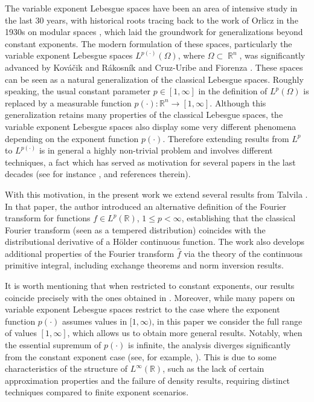 \documentclass[11pt,reqno]{amsart}
\theoremstyle{definition}
\theoremstyle{definition}
\theoremstyle{definition}
\DeclareMathOperator{\R}{\mathbb{R}}
\begin{document}


The variable exponent Lebesgue spaces have been an area of intensive study in the last 30 years, with historical roots tracing back to the work of Orlicz in the 1930s on modular spaces \cite{Orlicz1932}, which laid the groundwork for generalizations beyond constant exponents. The modern formulation of these spaces, particularly the variable exponent Lebesgue spaces $L^{p(\cdot)}(\Omega)$, where $\Omega\subset \R^n$, was significantly advanced by Kováčik and Rákosník \cite{KovacikRakosnik1991} and Cruz-Uribe and Fiorenza \cite{Cruz-Uribe}. These spaces can be seen as a natural generalization of the classical Lebesgue spaces. Roughly speaking, the usual constant parameter $p\in [1,\infty]$ in the definition of $L^p({\Omega})$ is replaced by a measurable function $p(\cdot):\mathbb{R}^n\to [1,\infty]$. Although this generalization retains many properties of the classical Lebesgue spaces, the variable exponent Lebesgue spaces also display some very different phenomena depending on the exponent function $p(\cdot)$. Therefore extending results from $L^p$ to $L^{p(\cdot)}$ is in general a highly non-trivial problem and involves different techniques, a fact which has served as motivation for several papers in the last decades (see for instance  \cite{Chamorro, CUHM16, Diening2004, Diening2004b, Sam98}, and references therein).

With this motivation, in the present work we extend several results from Talvila \cite{Talvila2025}. In that paper, the author introduced an alternative definition of the Fourier transform for functions $f \in L^p(\mathbb{R})$, $1\leq p<\infty$, establishing that the classical Fourier transform (seen as a tempered distribution) coincides with the distributional derivative of a Hölder continuous function. The work also develops additional properties of the Fourier transform $\widehat{f}$ via the theory of the continuous primitive integral, including exchange theorems and norm inversion results.

It is worth mentioning that when restricted to constant exponents, our results coincide precisely with the ones obtained in \cite{Talvila2025}. Moreover, while many papers on variable exponent Lebesgue spaces restrict to the case where the exponent function $p(\cdot)$ assumes values in $[1,\infty)$, in this paper we consider the full range of values $[1,\infty]$, which allows us to obtain more general results. Notably, when the essential supremum of $p(\cdot)$ is infinite, the analysis diverges significantly from the constant exponent case (see, for example, \cite{Hasto2009}). This is due to some characteristics of the structure of $L^\infty(\mathbb{R})$, such as the lack of certain approximation properties and the failure of density results, requiring distinct techniques compared to finite exponent scenarios.  
\end{document}
